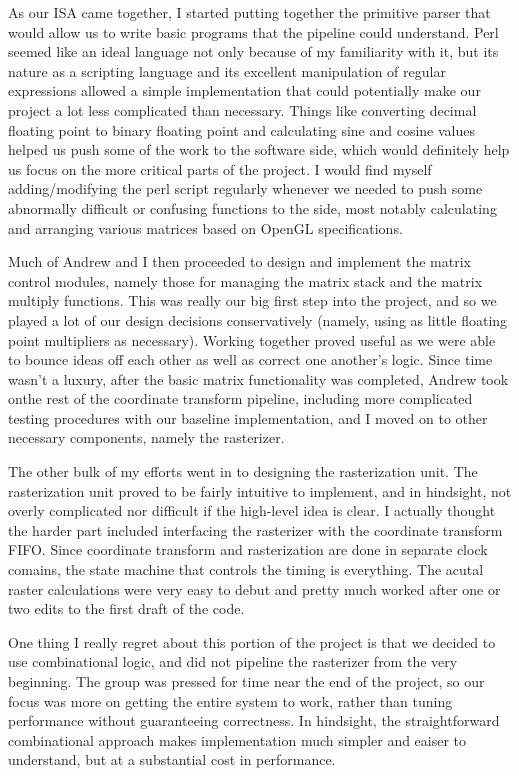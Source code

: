 \documentclass[letterpaper,10pt]{article}
\begin{document}
As our ISA came together, I started putting together the primitive parser that would allow us to write basic programs that the pipeline could understand. Perl seemed like an ideal language not only because of my familiarity with it, but its nature as a scripting language and its excellent manipulation of regular expressions allowed a simple implementation that could potentially make our project a lot less complicated than necessary. Things like converting decimal floating point to binary floating point and calculating sine and cosine values helped us push some of the work to the software side, which would definitely help us focus on the more critical parts of the project. I would find myself adding/modifying the perl script regularly whenever we needed to push some abnormally difficult or confusing functions to the side, most notably calculating and arranging various matrices based on OpenGL specifications.

Much of  Andrew and I then proceeded to design and implement the matrix control modules, namely those for managing the matrix stack and the matrix multiply functions. This was really our big first step into the project, and so we played a lot of our design decisions conservatively (namely, using as little floating point multipliers as necessary). Working together proved useful as we were able to bounce ideas off each other as well as correct one another's logic. Since time wasn't a luxury, after the basic matrix functionality was completed, Andrew took onthe rest of the coordinate transform pipeline, including more complicated testing procedures with our baseline implementation, and I moved on to other necessary components, namely the rasterizer.

The other bulk of my efforts went in to designing the rasterization unit. The rasterization unit proved to be fairly intuitive to implement, and in hindsight, not overly complicated nor difficult if the high-level idea is clear. I actually thought the harder part included interfacing the rasterizer with the coordinate transform FIFO. Since coordinate transform and rasterization are done in separate clock comains, the state machine that controls the timing is everything. The acutal raster calculations were very easy to debut and pretty much worked after one or two edits to the first draft of the code. 

One thing I really regret about this portion of the project is that we decided to use combinational logic, and did not pipeline the rasterizer from the very beginning. The group was pressed for time near the end of the project, so our focus was more on getting the entire system to work, rather than tuning performance without guaranteeing correctness. In hindsight, the straightforward combinational approach makes implementation much simpler and eaiser to understand, but at a substantial cost in performance.  
\end{document}
